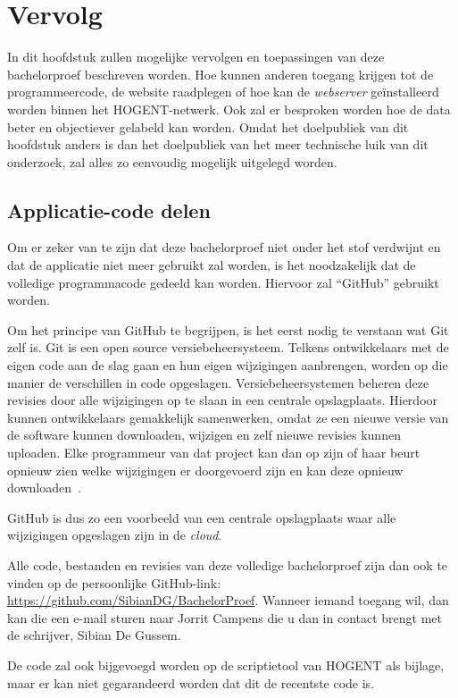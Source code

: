\chapter{Vervolg}
\label{ch:vervolg}

In dit hoofdstuk zullen mogelijke vervolgen en toepassingen van deze bachelorproef beschreven worden. Hoe kunnen anderen toegang krijgen tot de programmeercode, de website raadplegen of hoe kan de \textit{webserver} geïnstalleerd worden binnen het HOGENT-netwerk. Ook zal er besproken worden hoe de data beter en objectiever gelabeld kan worden. Omdat het doelpubliek van dit hoofdstuk anders is dan het doelpubliek van het meer technische luik van dit onderzoek, zal alles zo eenvoudig mogelijk uitgelegd worden.

\section{Applicatie-code delen}
Om er zeker van te zijn dat deze bachelorproef niet onder het stof verdwijnt en dat de applicatie niet meer gebruikt zal worden, is het noodzakelijk dat de volledige programmacode gedeeld kan worden. Hiervoor zal ``GitHub'' gebruikt worden.

Om het principe van GitHub te begrijpen, is het eerst nodig te verstaan wat Git zelf is. Git is een open source versiebeheersysteem. Telkens ontwikkelaars met de eigen code aan de slag gaan en hun eigen wijzigingen aanbrengen, worden op die manier de verschillen in code opgeslagen. Versiebeheersystemen beheren deze revisies door alle wijzigingen op te slaan in een centrale opslagplaats. Hierdoor kunnen ontwikkelaars gemakkelijk samenwerken, omdat ze een nieuwe versie van de software kunnen downloaden, wijzigen en zelf nieuwe revisies kunnen uploaden. Elke programmeur van dat project kan dan op zijn of haar beurt opnieuw zien welke wijzigingen er doorgevoerd zijn en kan deze opnieuw downloaden~\autocite{Brown2019}.

GitHub is dus zo een voorbeeld van een centrale opslagplaats waar alle wijzigingen opgeslagen zijn in de \textit{cloud}.

Alle code, bestanden en revisies van deze volledige bachelorproef zijn dan ook te vinden op de persoonlijke GitHub-link: \url{https://github.com/SibianDG/BachelorProef}. Wanneer iemand toegang wil, dan kan die een e-mail sturen naar Jorrit Campens die u dan in contact brengt met de schrijver, Sibian De Gussem.

De code zal ook bijgevoegd worden op de scriptietool van HOGENT als bijlage, maar er kan niet gegarandeerd worden dat dit de recentste code is.

